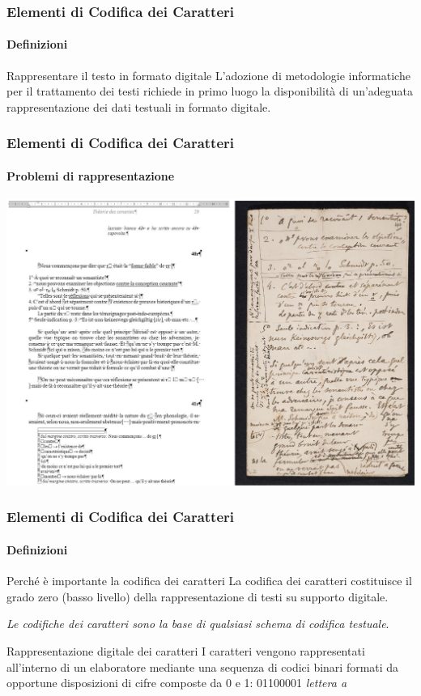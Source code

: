 \begin{frame}
	\frametitle{Elementi di Codifica dei Caratteri}
	\framesubtitle{Definizioni}
	\addtocounter{nframe}{1}

	\begin{block}{Rappresentare il testo in formato digitale}
		L’adozione di metodologie informatiche per il trattamento dei testi richiede in primo luogo la disponibilità di un'adeguata rappresentazione dei dati testuali in formato digitale.
	\end{block}

\end{frame}

\begin{frame}
	\frametitle{Elementi di Codifica dei Caratteri}
	\framesubtitle{Problemi di rappresentazione}
	\addtocounter{nframe}{1}

	\begin{center}
		\includegraphics[width=.9\textwidth]{imgs/SaussureTrascrizione.pdf}
	\end{center}

\end{frame}


\begin{frame}
	\frametitle{Elementi di Codifica dei Caratteri}
	\framesubtitle{Definizioni}
	\addtocounter{nframe}{1}

	\begin{block}{Perché è importante la codifica dei caratteri}
		La codifica dei caratteri costituisce il grado zero (basso livello) della rappresentazione di testi su supporto digitale.
		\begin{center}
			\textit{Le codifiche dei caratteri sono la base di qualsiasi schema di codifica testuale}.
		\end{center}
	\end{block}

	\begin{block}{Rappresentazione digitale dei caratteri}
		I caratteri vengono rappresentati all’interno di un elaboratore mediante una sequenza di codici binari formati da opportune disposizioni di cifre composte da 0 e 1: 01100001 \textit{lettera a}
	\end{block}

\end{frame}




